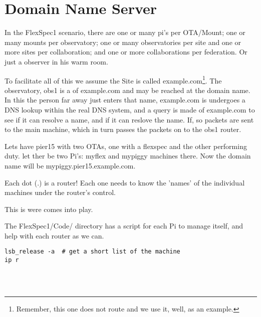 \section{Domain Name Server}

In the FlexSpec1 scenario, there are one or many  pi's per OTA/Mount; one or many 
mounts per observatory; one or many observatories per site and one or more sites
per collaboration; and one or more collaborations per federation. Or just a observer
in his warm room.

To facilitate all of this we assume the Site is called
example.com\footnote{Remember, this one does not route and we use it,
  well, as an example.}. The observatory, obs1 is a  of
example.com and may be reached at the  domain
name. In this the person far away just enters that name, example.com
is undergoes a DNS lookup within the real DNS system, and a query is
made of example.com to see if it can resolve a name, and if it can
reslove the  name.  If, so packets are sent
to the main machine, which in turn passes the packets on to the
obs1 router.

Lets have pier15 with two OTAs, one with a flexspec and the other
performing  duty. let ther be two Pi's:  myflex and mypiggy
machines there. Now the domain name will be
mypiggy.pier15.example.com.

Each dot (.) is a router! Each one needs to know the 'names' of the
individual machines under the router's control.

This is were  comes into play.

The FlexSpec1/Code/ directory has a script for each Pi to manage itself,
and help with each router as we can.




\begingroup \fontsize{10pt}{10pt}
\selectfont
\begin{verbatim} 
lsb_release -a  # get a short list of the machine
ip r




\end{verbatim}
\endgroup


